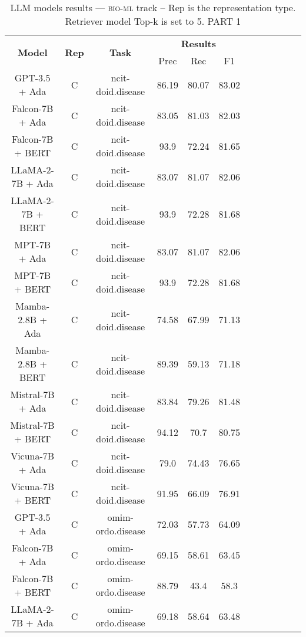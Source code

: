\begin{table}
        \centering
        \small
        \caption{LLM models results --- \textsc{bio-ml} track -- Rep is the representation type. Retriever model Top-k is set to 5. PART 1 } \label{tab:llm_bio-ml1}
        \begin{tabular}{|c|c|c|c|c|c|c|c|c|c|c|c|}
            \hline
             \multirow{2}{*}{\textbf{Model}}  & \multirow{2}{*}{\textbf{Rep}}  & \multirow{2}{*}{\textbf{Task}} &  \multicolumn{3}{c|}{\textbf{Results}} \\
             \cline{4-6}
              & & & Prec & Rec & F1  \\
            \hline
	GPT-3.5 + Ada  & C & ncit-doid.disease  &  86.19 &  80.07 & 83.02  \\
	Falcon-7B + Ada  & C & ncit-doid.disease  &  83.05 &  81.03 & 82.03  \\
	Falcon-7B + BERT  & C & ncit-doid.disease  &  93.9 &  72.24 & 81.65  \\
	LLaMA-2-7B + Ada  & C & ncit-doid.disease  &  83.07 &  81.07 & 82.06  \\
	LLaMA-2-7B + BERT  & C & ncit-doid.disease  &  93.9 &  72.28 & 81.68  \\
	MPT-7B + Ada  & C & ncit-doid.disease  &  83.07 &  81.07 & 82.06  \\
	MPT-7B + BERT  & C & ncit-doid.disease  &  93.9 &  72.28 & 81.68  \\
	Mamba-2.8B + Ada  & C & ncit-doid.disease  &  74.58 &  67.99 & 71.13  \\
	Mamba-2.8B + BERT  & C & ncit-doid.disease  &  89.39 &  59.13 & 71.18  \\
	Mistral-7B + Ada  & C & ncit-doid.disease  &  83.84 &  79.26 & 81.48  \\
	Mistral-7B + BERT  & C & ncit-doid.disease  &  94.12 &  70.7 & 80.75  \\
	Vicuna-7B + Ada  & C & ncit-doid.disease  &  79.0 &  74.43 & 76.65  \\
	Vicuna-7B + BERT  & C & ncit-doid.disease  &  91.95 &  66.09 & 76.91  \\
	\hline
	GPT-3.5 + Ada  & C & omim-ordo.disease  &  72.03 &  57.73 & 64.09  \\
	Falcon-7B + Ada  & C & omim-ordo.disease  &  69.15 &  58.61 & 63.45  \\
	Falcon-7B + BERT  & C & omim-ordo.disease  &  88.79 &  43.4 & 58.3  \\
	LLaMA-2-7B + Ada  & C & omim-ordo.disease  &  69.18 &  58.64 & 63.48  \\

\end{tabular}
\end{table}
